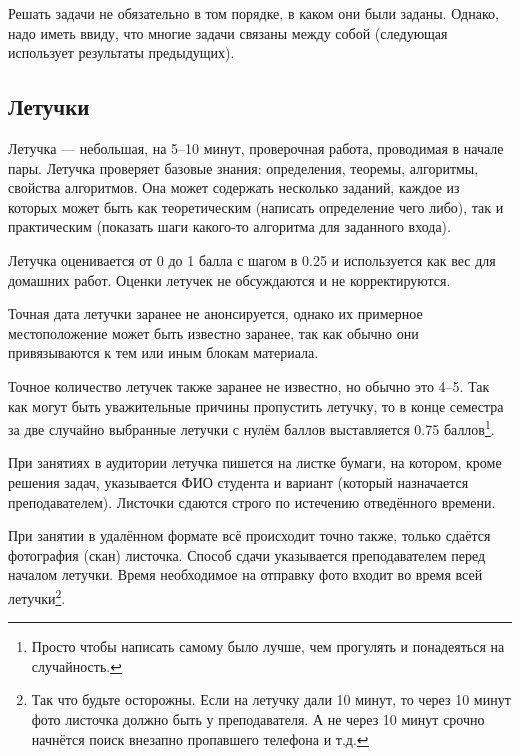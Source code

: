 Решать задачи не обязательно в том порядке, в каком они были заданы. Однако, надо иметь ввиду, что многие задачи связаны между собой (следующая использует результаты предыдущих).

\subsection{Летучки}

Летучка --- небольшая, на 5--10 минут, проверочная работа, проводимая в начале пары. 
Летучка проверяет базовые знания: определения, теоремы, алгоритмы, свойства алгоритмов. 
Она может содержать несколько заданий, каждое из которых может быть как теоретическим (написать определение чего либо), так и практическим (показать шаги какого-то алгоритма для заданного входа).

Летучка оценивается от 0 до 1 балла с шагом в 0.25 и используется как вес для домашних работ. Оценки летучек не обсуждаются и не корректируются. 

Точная дата летучки заранее не анонсируется, однако их примерное местоположение может быть известно заранее, так как обычно они привязываются к тем или иным блокам материала.

Точное количество летучек также заранее не известно, но обычно это 4--5. Так как могут быть уважительные причины пропустить летучку, то в конце семестра за две случайно выбранные летучки с нулём баллов выставляется 0.75 баллов\footnote{Просто чтобы написать самому было лучше, чем прогулять и понадеяться на случайность.}. 

При занятиях в аудитории летучка пишется на листке бумаги, на котором, кроме решения задач, указывается ФИО студента и вариант (который назначается преподавателем). Листочки сдаются строго по истечению отведённого времени.

При занятии в удалённом формате всё происходит точно также, только сдаётся фотография (скан) листочка. Способ сдачи указывается преподавателем перед началом летучки. Время необходимое на отправку фото входит во время всей летучки\footnote{Так что будьте осторожны. Если на летучку дали 10 минут, то через 10 минут фото листочка должно быть у преподавателя. А не через 10 минут срочно начнётся поиск внезапно пропавшего телефона и т.д.}.